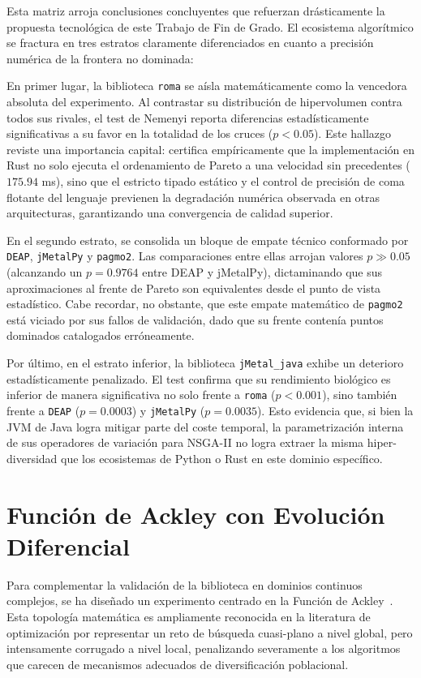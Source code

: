 \documentclass[12pt,a4paper,twoside,openright]{book}
\begin{document}
    Esta matriz arroja conclusiones concluyentes que refuerzan drásticamente la propuesta tecnológica de este Trabajo de Fin de Grado. El ecosistema algorítmico se fractura en tres estratos claramente diferenciados en cuanto a precisión numérica de la frontera no dominada:

    En primer lugar, la biblioteca \texttt{roma} se aísla matemáticamente como la vencedora absoluta del experimento. Al contrastar su distribución de hipervolumen contra todos sus rivales, el test de Nemenyi reporta diferencias estadísticamente significativas a su favor en la totalidad de los cruces ($p < 0.05$). Este hallazgo reviste una importancia capital: certifica empíricamente que la implementación en Rust no solo ejecuta el ordenamiento de Pareto a una velocidad sin precedentes ($175.94$ ms), sino que el estricto tipado estático y el control de precisión de coma flotante del lenguaje previenen la degradación numérica observada en otras arquitecturas, garantizando una convergencia de calidad superior.

    En el segundo estrato, se consolida un bloque de empate técnico conformado por \texttt{DEAP}, \texttt{jMetalPy} y \texttt{pagmo2}. Las comparaciones entre ellas arrojan valores $p \gg 0.05$ (alcanzando un $p=0.9764$ entre DEAP y jMetalPy), dictaminando que sus aproximaciones al frente de Pareto son equivalentes desde el punto de vista estadístico. Cabe recordar, no obstante, que este empate matemático de \texttt{pagmo2} está viciado por sus fallos de validación, dado que su frente contenía puntos dominados catalogados erróneamente.

    Por último, en el estrato inferior, la biblioteca \texttt{jMetal\_java} exhibe un deterioro estadísticamente penalizado. El test confirma que su rendimiento biológico es inferior de manera significativa no solo frente a \texttt{roma} ($p < 0.001$), sino también frente a \texttt{DEAP} ($p=0.0003$) y \texttt{jMetalPy} ($p=0.0035$). Esto evidencia que, si bien la JVM de Java logra mitigar parte del coste temporal, la parametrización interna de sus operadores de variación para NSGA-II no logra extraer la misma hiper-diversidad que los ecosistemas de Python o Rust en este dominio específico.

\section{Función de Ackley con Evolución Diferencial}
    Para complementar la validación de la biblioteca en dominios continuos complejos, se ha diseñado un experimento centrado en la Función de Ackley~\cite{ackley1987connectionist}. Esta topología matemática es ampliamente reconocida en la literatura de optimización por representar un reto de búsqueda cuasi-plano a nivel global, pero intensamente corrugado a nivel local, penalizando severamente a los algoritmos que carecen de mecanismos adecuados de diversificación poblacional.
\end{document}
